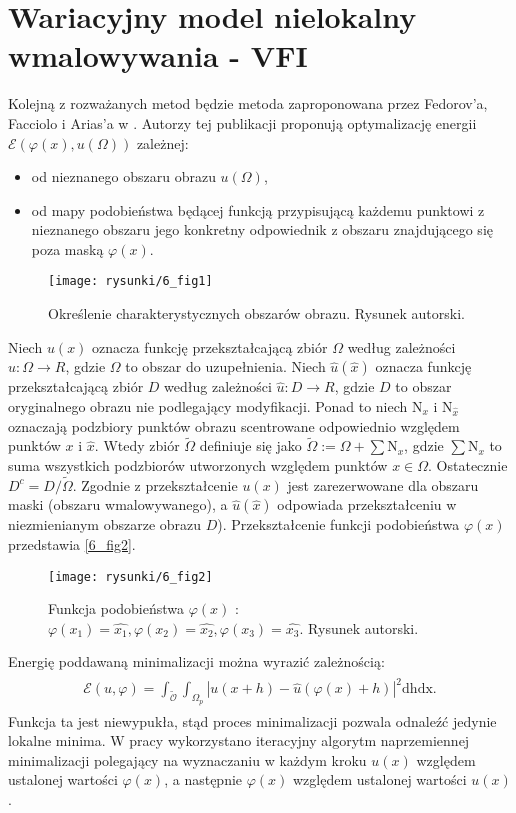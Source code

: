 \documentclass[12pt, twoside, openany]{report}
\theoremstyle{definition}
\newcommand*{\abs}[1]{\left\vert{#1}\right\vert}
\begin{document}
\section{Wariacyjny model nielokalny wmalowywania - VFI}
\label{sec:sVFI}
Kolejną z rozważanych metod będzie metoda zaproponowana przez Fedorov'a, Facciolo i Arias'a w \cite{arias2011variational}. Autorzy tej publikacji proponują optymalizację energii $\mathcal{E}(\varphi(x), u(\Omega))$ zależnej:
\begin{itemize}
\item
od nieznanego obszaru obrazu $u(\Omega)$,
\item
od mapy podobieństwa będącej funkcją przypisującą każdemu punktowi z nieznanego obszaru jego konkretny odpowiednik z obszaru znajdującego się poza maską $\varphi(x)$.
\end{itemize}
\begin{figure}[!h]
	\centering
	\texttt{[image: rysunki/6\_fig1]}
	\caption{Określenie charakterystycznych obszarów obrazu. Rysunek autorski.}
	\label{6_fig1}
\end{figure}
Niech $u(x)$ oznacza funkcję przekształcającą zbiór $\Omega$ według zależności  $u:\Omega \rightarrow R$, gdzie $\Omega$ to obszar do uzupełnienia.
Niech $\hat{u}(\hat{x})$ oznacza funkcję przekształcającą zbiór $D$ według zależności $\hat{u} : D \rightarrow R$, gdzie $D$ to obszar oryginalnego obrazu nie podlegający modyfikacji.
Ponad to niech $\mathrm{N}_x$ i $\mathrm{N}_{\hat{x}}$ oznaczają podzbiory punktów obrazu scentrowane odpowiednio względem punktów $x$ i $\hat{x}$.
Wtedy zbiór $\widetilde{\Omega}$ definiuje się jako $\widetilde{\Omega} := \Omega + \sum {\mathrm{N}}_x$, gdzie $\sum {\mathrm{N}}_x$ to suma wszystkich podzbiorów utworzonych względem punktów $x \in \Omega$. Ostatecznie $D^c = D / \widetilde{\Omega}$.
Zgodnie z \cite{arias2011variational} przekształcenie $u(x)$ jest zarezerwowane dla obszaru maski (obszaru wmalowywanego), a $\hat{u}(\hat{x})$ odpowiada przekształceniu w niezmienianym obszarze obrazu $D$). 
Przekształcenie funkcji podobieństwa $\varphi(x)$ przedstawia \autoref{6_fig2}.
\begin{figure}[!h]
	\centering
	\texttt{[image: rysunki/6\_fig2]}
	\caption{Funkcja podobieństwa $\varphi(x)$ : $\varphi(x_1)=\hat{x_1}, \varphi(x_2)=\hat{x_2}, \varphi(x_3)=\hat{x_3}$. Rysunek autorski.}
	\label{6_fig2}
\end{figure}
Energię poddawaną minimalizacji można wyrazić zależnością:
\begin{align}
\begin{aligned}
\mathcal{E}(u,\varphi) = \int_{\mathcal{\widetilde{O}}}\int_{\Omega_p}\abs{u(x+h) - \hat{u}(\varphi(x)+h)}^2\mathrm{dhdx}.
\end{aligned}
\end{align}
Funkcja ta jest niewypukła, stąd proces minimalizacji pozwala odnaleźć jedynie lokalne minima. W pracy wykorzystano iteracyjny algorytm naprzemiennej minimalizacji polegający na wyznaczaniu w każdym kroku $u(x)$ względem ustalonej wartości $\varphi(x)$, a następnie $\varphi(x)$ względem ustalonej wartości $u(x)$.
\end{document}
